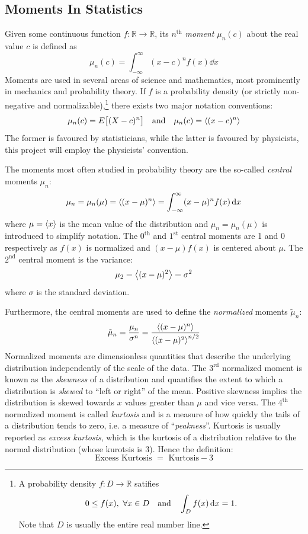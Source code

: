 \documentclass[nofootinbib,reprint,english]{revtex4-1}
\begin{document}
\subsection{Moments In Statistics}
Given some continuous function \(f:\mathbb{R}\to\mathbb{R}\), its \(n^\text{th}\) \emph{moment} \(\mu_n(c)\) about the real value \(c\) is defined as
\begin{equation}\label{eq:moments}
\mu_n(c)=\int_{-\infty}^\infty(x-c)^nf(x)\dd{x}
\end{equation}
Moments are used in several areas of science and mathematics, most prominently in mechanics and probability theory. If \(f\) is a probability density (or strictly non-negative and normalizable),\footnote{A probability density \(f:D\to\mathbb{R}\) satifies
\[0\leq f(x),\ \forall x\in D\qand\int_Df(x)\dd{x}=1.\]
Note that \(D\) is usually the entire real number line.} there exists two major notation conventions:
\[\mu_n(c)=E\big[(X-c)^n\big]\qand\mu_n(c)=\expval{(x-c)^n}\]
The former is favoured by statisticians, while the latter is favoured by physicists, this project will employ the physicists' convention.

The moments most often studied in probability theory are the so-called \emph{central} moments \(\mu_n\):
\begin{equation}\label{eq:central_moments}
\mu_n=\mu_n(\mu)=\expval{(x-\mu)^n}=\int_{-\infty}^\infty(x-\mu)^nf(x)\dd{x}
\end{equation}
where \(\mu=\expval{x}\) is the mean value of the distribution and \(\mu_n=\mu_n(\mu)\) is introduced to simplify notation. The \(0^\text{th}\) and \(1^\text{st}\) central moments are 1 and 0 respectively as \(f(x)\) is normalized and \((x-\mu)f(x)\) is centered about \(\mu\). The \(2^\text{nd}\) central moment is the variance:
\begin{equation}
\mu_2=\expval{(x-\mu)^2}=\sigma^2
\end{equation}
where \(\sigma\) is the standard deviation.

Furthermore, the central moments are used to define the \emph{normalized} moments \(\tilde{\mu}_n\):
\begin{equation}
\tilde{\mu}_n=\frac{\mu_n}{\sigma^n}=\frac{\expval{(x-\mu)^n}}{\expval{(x-\mu)^2}^{n/2}}
\end{equation}
Normalized moments are dimensionless quantities that describe the underlying distribution independently of the scale of the data. The \(3^\text{rd}\) normalized moment is known as the \emph{skewness} of a distribution and quantifies the extent to which a distribution is \emph{skewed} to ``left or right'' of the mean. Positive skewness implies the distribution is skewed towards \(x\) values greater than \(\mu\) and vice versa. The \(4^\text{th}\) normalized moment is called \emph{kurtosis} and is a measure of how quickly the tails of a distribution tends to zero, i.e. a measure of ``\emph{peakness}''. Kurtosis is usually reported as \emph{excess kurtosis}, which is the kurtosis of a distribution relative to the normal distribution (whose kurotsis is 3). Hence the definition:
\begin{equation}
\text{Excess Kurtosis }=\text{ Kurtosis}-3
\end{equation}
\end{document}
